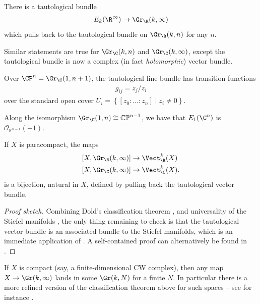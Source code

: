 \documentclass[11pt]{amsart}
\begin{document}
\begin{proposition} There is a tautological bundle
\begin{align*}
    E_k(\R^\infty) \to \Gr_\R(k,\infty)
\end{align*}
which pulls back to the tautological bundle on $\Gr_\R(k,n)$ for any $n$.
\end{proposition}


\begin{remark} Similar statements are true for $\Gr_\C(k,n)$ and $\Gr_\C(k,\infty)$, except the tautological bundle is now a complex (in fact \emph{holomorphic}) vector bundle.
\end{remark}

\begin{example} Over $\CP^n = \Gr_\C(1,n+1)$, the tautological line bundle has transition functions
\begin{align*}
    g_{ij} = z_j/z_i
\end{align*}
over the standard open cover $U_i = \left\{ [z_0: \ldots : z_n] \mid z_i\ne 0 \right\}$.
\end{example}

\begin{remark} Along the isomorphism $\Gr_\C(1,n) \cong \mathbb{CP}^{n-1}$, we have that $E_1(\C^n)$ is $\mathcal{O}_{\mathbb{P}^{n-1}}(-1)$.
\end{remark}

\begin{theorem} If $X$ is paracompact, the maps
\begin{align*}
    \left[ X,\Gr_\R(k,\infty) \right] &\to \Vect_\R^k(X) \\
    \left[ X, \Gr_\C(k,\infty) \right] &\to \Vect_\C^k(X).
\end{align*}
is a bijection, natural in $X$, defined by pulling back the tautological vector bundle.
\end{theorem}
\begin{proof}[Proof sketch] Combining Dold's classification theorem , and universality of the Stiefel manifolds , the only thing remaining to check is that the tautological vector bundle is an associated bundle to the Stiefel manifolds, which is an immediate application of . A self-contained proof can alternatively be found in \cite[1.16]{hatcherVectorBundlesKtheory}.
\end{proof}

\begin{remark} If $X$ is compact (say, a finite-dimensional CW complex), then any map $X \to \Gr(k,\infty)$ lands in some $\Gr(k,N)$ for a finite $N$. In particular there is a more refined version of the classification theorem above for such spaces -- see for instance \cite[19.4]{Steenrod-fibre-bundles}. 
\end{remark}
\end{document}
